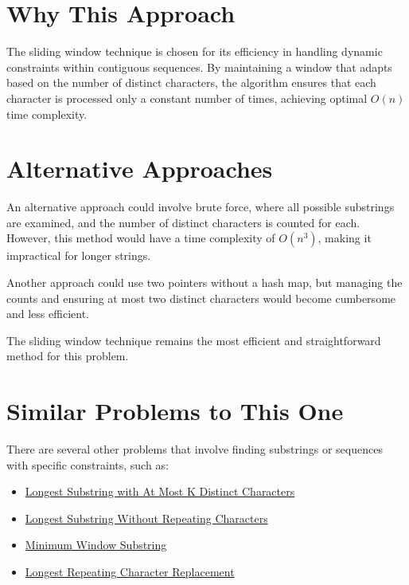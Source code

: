 \section*{Why This Approach}

The sliding window technique is chosen for its efficiency in handling dynamic constraints within contiguous sequences. By maintaining a window that adapts based on the number of distinct characters, the algorithm ensures that each character is processed only a constant number of times, achieving optimal \(O(n)\) time complexity.

\section*{Alternative Approaches}

An alternative approach could involve brute force, where all possible substrings are examined, and the number of distinct characters is counted for each. However, this method would have a time complexity of \(O(n^3)\), making it impractical for longer strings.

Another approach could use two pointers without a hash map, but managing the counts and ensuring at most two distinct characters would become cumbersome and less efficient.

The sliding window technique remains the most efficient and straightforward method for this problem.

\section*{Similar Problems to This One}

There are several other problems that involve finding substrings or sequences with specific constraints, such as:

\begin{itemize}
    \item \hyperref[problem:longest_substring_with_at_most_k_distinct_characters]{Longest Substring with At Most K Distinct Characters}
    \item \hyperref[problem:longest_substring_without_repeating_characters]{Longest Substring Without Repeating Characters}
    \item \hyperref[problem:minimum_window_substring]{Minimum Window Substring}
    \item \hyperref[problem:longest_repeating_character_replacement]{Longest Repeating Character Replacement}
\end{itemize}

